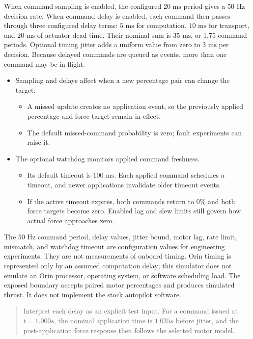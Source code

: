 \documentclass[10pt,letterpaper]{article}
\newenvironment{reportnote}{\begin{quote}\small\color{navy}}{\end{quote}}
\begin{document}
When command sampling is enabled, the configured \(20\text{ ms}\) period gives a 50 Hz decision rate. When command delay is enabled, each command then passes through three configured delay terms: \(5\text{ ms}\) for computation, \(10\text{ ms}\) for transport, and \(20\text{ ms}\) of actuator dead time. Their nominal sum is \(35\text{ ms}\), or 1.75 command periods. Optional timing jitter adds a uniform value from zero to \(3\text{ ms}\) per decision. Because delayed commands are queued as events, more than one command may be in flight.

\begin{itemize}
\item
  Sampling and delays affect when a new percentage pair can change the target.

  \begin{itemize}
  \item
    A missed update creates no application event, so the previously applied percentage and force target remain in effect.
  \item
    The default missed-command probability is zero; fault experiments can raise it.
  \end{itemize}
\item
  The optional watchdog monitors applied command freshness.

  \begin{itemize}
  \item
    Its default timeout is \(100\text{ ms}\). Each applied command schedules a timeout, and newer applications invalidate older timeout events.
  \item
    If the active timeout expires, both commands return to 0\% and both force targets become zero. Enabled lag and slew limits still govern how actual force approaches zero.
  \end{itemize}
\end{itemize}

The 50 Hz command period, delay values, jitter bound, motor lag, rate limit, mismatch, and watchdog timeout are configuration values for engineering experiments. They are not measurements of onboard timing. Orin timing is represented only by an assumed computation delay; this simulator does not emulate an Orin processor, operating system, or software scheduling load. The exposed boundary accepts paired motor percentages and produces simulated thrust. It does not implement the stock autopilot software.

\begin{reportnote}

Interpret each delay as an explicit test input. For a command issued at \(t = 1.000s\), the nominal application time is \(1.035s\) before jitter, and the post-application force response then follows the selected motor model.

\end{reportnote}
\end{document}
